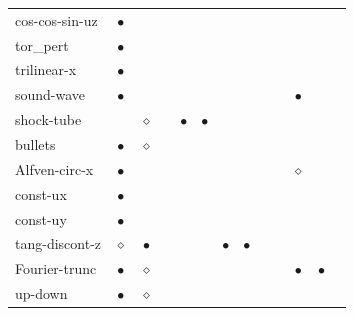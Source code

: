 \documentclass[\mydriver,12pt,twoside,notitlepage,a4paper]{article}
\newcommand{\req}{$\bullet$}
\newcommand{\opt}{$\diamond$}
\begin{document}
\begin{tabular}{@{}l|c|c|c|c|c|c|c|c|c|c|c|c}
                    & {}   & {}   & {}   & {}   & {}   \\
\midrule
   cos-cos-sin-uz   & \req & {}   & {}   & {}   & {}   & {}   & {}
                    & {}   & {}   & {}   & {}   & {}   \\
\midrule
   tor_pert         & \req & {}   & {}   & {}   & {}   & {}   & {}
                    & {}   & {}   & {}   & {}   & {}   \\
\midrule
   trilinear-x      & \req & {}   & {}   & {}   & {}   & {}   & {}
                    & {}   & {}   & {}   & {}   & {}   \\
\midrule
   sound-wave       & \req & {}   & {}   & {}   & {}   & {}   & {}
                    & {}   & {}   & \req & {}   & {}   \\
\midrule
   shock-tube       & {}   & \opt & {}   & \req & \req & {}   & {}
                    & {}   & {}   & {}   & {}   & {}   \\
\midrule
   bullets          & \req & \opt & {}   & {}   & {}   & {}   & {}
                    & {}   & {}   & {}   & {}   & {}   \\
\midrule
   Alfven-circ-x    & \req & {}   & {}   & {}   & {}   & {}   & {}
                    & {}   & {}   & \opt & {}   & {}   \\
\midrule
   const-ux         & \req & {}   & {}   & {}   & {}   & {}   & {}
                    & {}   & {}   & {}   & {}   & {}   \\
\midrule
   const-uy         & \req & {}   & {}   & {}   & {}   & {}   & {}
                    & {}   & {}   & {}   & {}   & {}   \\
\midrule
   tang-discont-z   & \opt & \req & {}   & {}   & {}   & \req & \req
                    & {}   & {}   & {}   & {}   & {}   \\
\midrule
   Fourier-trunc    & \req & \opt & {}   & {}   & {}   & {}   & {}
                    & {}   & {}   & \req & \req & {}   \\
\midrule
   up-down          & \req & \opt & {}   & {}   & {}   & {}   & {}
                    & {}   & {}   & {}   & {}   & {}   \\
%
\bottomrule
\end{tabular}
\end{document}
